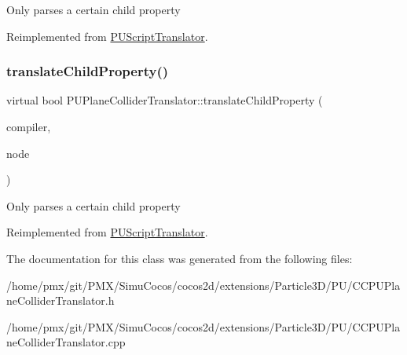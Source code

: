 Only parses a certain child property 

Reimplemented from \hyperlink{classPUScriptTranslator_a0374d83a8a04e57918975d525e0f8fe8}{P\+U\+Script\+Translator}.

\mbox{\label{classPUPlaneColliderTranslator_a772c6f955228702c943cb33cc66af721}} 
\subsubsection{\texorpdfstring{translate\+Child\+Property()}{translateChildProperty()}\hspace{0.1cm}{\footnotesize\ttfamily [2/2]}}
{\footnotesize\ttfamily virtual bool P\+U\+Plane\+Collider\+Translator\+::translate\+Child\+Property (\begin{DoxyParamCaption}\item[{\hyperlink{classPUScriptCompiler}{P\+U\+Script\+Compiler} $\ast$}]{compiler,  }\item[{\hyperlink{classPUAbstractNode}{P\+U\+Abstract\+Node} $\ast$}]{node }\end{DoxyParamCaption})\hspace{0.3cm}{\ttfamily [virtual]}}

Only parses a certain child property 

Reimplemented from \hyperlink{classPUScriptTranslator_a0374d83a8a04e57918975d525e0f8fe8}{P\+U\+Script\+Translator}.



The documentation for this class was generated from the following files\+:\begin{DoxyCompactItemize}
\item 
/home/pmx/git/\+P\+M\+X/\+Simu\+Cocos/cocos2d/extensions/\+Particle3\+D/\+P\+U/C\+C\+P\+U\+Plane\+Collider\+Translator.\+h\item 
/home/pmx/git/\+P\+M\+X/\+Simu\+Cocos/cocos2d/extensions/\+Particle3\+D/\+P\+U/C\+C\+P\+U\+Plane\+Collider\+Translator.\+cpp\end{DoxyCompactItemize}
